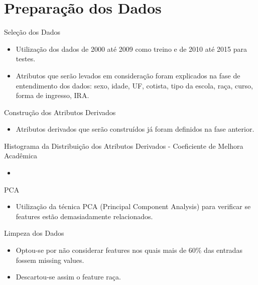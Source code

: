
\section{Preparação dos Dados}
\begin{frame}{Seleção dos Dados}
\begin{itemize}[itemsep=3ex]
    \item Utilização dos dados de 2000 até 2009 como treino e de 2010 até 2015 para
        testes. 
    \item Atributos que serão levados em consideração foram explicados na fase de
        entendimento dos dados: sexo, idade, UF, cotista, tipo da escola, raça,
        curso, forma de ingresso, IRA.
\end{itemize}
\end{frame}

\begin{frame}{Construção dos Atributos Derivados}
\begin{itemize}[itemsep=3ex]
    \item Atributos derivados que serão construídos já foram definidos na fase
        anterior.
\end{itemize}
\end{frame}

\begin{frame}{Histograma da Distribuição dos Atributos Derivados - Coeficiente de
    Melhora Acadêmica}
\begin{itemize}[itemsep=3ex]
        \item <Por histograma aqui>
\end{itemize}
\end{frame}

\begin{frame}{PCA}
\begin{itemize}[itemsep=3ex]
    \item Utilização da técnica PCA (Principal Component Analysis) para verificar se
        features estão demasiadamente relacionados. 
\end{itemize}
\end{frame}

\begin{frame}{Limpeza dos Dados}
\begin{itemize}[itemsep=3ex]
    \item Optou-se por não considerar features nos quais mais de 60\% das entradas
        fossem missing values.
    \item Descartou-se assim o feature raça.
\end{itemize}
\end{frame}

